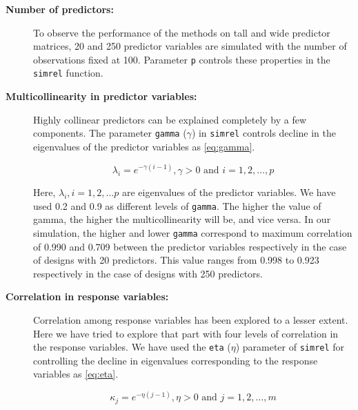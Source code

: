 \documentclass[review]{elsarticle}
\begin{document}
\begin{description}
\item[\textbf{Number of predictors:}]
To observe the performance of the methods on tall and wide predictor matrices, 20 and 250 predictor variables are simulated with the number of observations fixed at 100. Parameter \texttt{p} controls these properties in the \texttt{simrel} function.
\item[\textbf{Multicollinearity in predictor variables:}]
Highly collinear predictors can be explained completely by a few components. The parameter \texttt{gamma} (\(\gamma\)) in \texttt{simrel} controls decline in the eigenvalues of the predictor variables as \eqref{eq:gamma}.

\begin{equation}
  \lambda_i = e^{-\gamma(i - 1)}, \gamma > 0 \text{ and } i = 1, 2, \ldots, p
  \label{eq:gamma}
\end{equation}

Here, \(\lambda_i, i = 1, 2, \ldots p\) are eigenvalues of the predictor variables. We have used 0.2 and 0.9 as different levels of \texttt{gamma}. The higher the value of gamma, the higher the multicollinearity will be, and vice versa. In our simulation, the higher and lower \texttt{gamma} correspond to maximum correlation of 0.990 and 0.709 between the predictor variables respectively in the case of designs with 20 predictors. This value ranges from 0.998 to 0.923 respectively in the case of designs with 250 predictors.
\item[\textbf{Correlation in response variables:}]
Correlation among response variables has been explored to a lesser extent. Here we have tried to explore that part with four levels of correlation in the response variables. We have used the \texttt{eta} (\(\eta\)) parameter of \texttt{simrel} for controlling the decline in eigenvalues corresponding to the response variables as \eqref{eq:eta}.

\begin{equation}
  \kappa_j = e^{-\eta(j - 1)}, \eta > 0 \text{ and } j = 1, 2, \ldots, m
  \label{eq:eta}
\end{equation}


\end{description}
\end{document}

